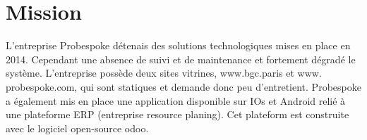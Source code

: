 \chapter{Mission}

L'entreprise Probespoke détenais des solutions technologiques mises en place en 2014.
Cependant une absence de suivi et de maintenance et fortement dégradé le système. L'entreprise possède deux sites vitrines, www.bgc.paris et www. probespoke.com, qui sont statiques et demande donc peu d'entretient.
Probespoke a également mis en place une application disponible sur IOs et Android relié à une plateforme ERP (entreprise resource planing). Cet plateform est construite avec le logiciel open-source odoo.
 
